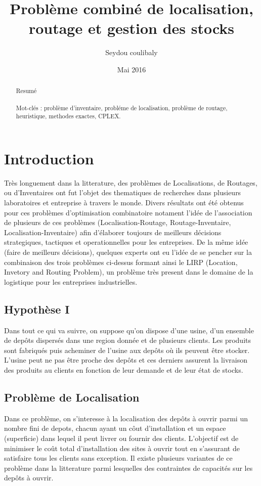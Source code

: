 \documentclass[a4paper,10pt]{article}
\title{Problème combiné de localisation, routage et gestion des stocks}
\author{Seydou coulibaly}
\date{Mai 2016}
\begin{document}
\maketitle
\newpage
\begin{abstract}

Resumé

\paragraph{} 
Mot-cl\'es : problème d'inventaire, probléme de localisation, problème de routage, heuristique, methodes exactes, CPLEX.
\end{abstract}
\newpage
\section{Introduction}

Très longuement dans la litterature, des problèmes de Localisations, de Routages, ou d'Inventaires ont fut l'objet des thematiques de recherches 
dans plusieurs laboratoires et entreprise à travers le monde. Divers résultats ont été obtenus pour ces problèmes d'optimisation combinatoire
notament l'idée de l'association de plusieurs de ces problèmes (Localisation-Routage, Routage-Inventaire, Localisation-Inventaire) afin d'élaborer toujours de meilleurs décisions
strategiques, tactiques et operationnelles pour les entreprises. De la même idée (faire de meilleurs décisions), quelques experts ont eu l'idée de se 
pencher sur la combinaison des  trois problèmes ci-dessus formant ainsi le LIRP (Location, Invetory and Routing Problem), un problème très 
present dans le domaine de la logistique pour les entreprises industrielles.
\subsection*{Hypothèse I}
Dans tout ce qui va suivre, on suppose qu'on dispose d'une usine, d'un ensemble de depôts dispersés dans une region donnée et de plusieurs clients.
Les produits sont fabriqués puis acheminer de l'usine aux depôts où ils peuvent être stocker. L'usine peut ne pas être proche des depôts et ces derniers
assurent la livraison des produits au clients en fonction de leur demande et de leur état de stocks.
\subsection*{Problème de Localisation}
Dans ce problème, on s'interesse à la localisation des depôts à ouvrir parmi un nombre fini de depots, chacun ayant un côut d'installation et 
un espace (superficie) dans lequel il peut livrer ou fournir des clients. L'objectif est de minimiser le coût total d'installation des sites à ouvrir 
tout en s'assurant de satisfaire tous les clients sans exception. Il existe plusieurs variantes de ce problème dans la litterature parmi lesquelles
des contraintes de capacités sur les depôts à ouvrir.
\end{document}
